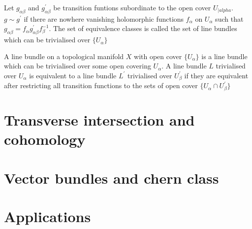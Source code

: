\documentclass{article}
\begin{document}
\begin{df}
    Let $g_{\alpha \beta }$ and $g_{\alpha \beta}^{'}$ be transition funtions subordinate
    to the open cover ${U_{|alpha}}$. $g\sim g^{'} $ if there are nowhere vanishing holomorphic functions
    $f_{\alpha}$ on ${U_{\alpha}}$ such that $g_{\alpha \beta } = f_{\alpha} g_{\alpha \beta}^{'} f_{\beta}^{-1}$.
    The set of equivalence classes is called the set of line bundles which can be trivialised over $\{U_{\alpha}\}$

    
\end{df}

\begin{df}
    A line bundle on a topological manifold $X$ with open cover $\{U_{\alpha}\}$ is a line bundle which can 
    be trivialised over some open covering ${U_{\alpha}}$. A line bundle $L$ trivialised over ${U_{\alpha}}$
    is equivalent to a line bundle $L^{'}$ trivialised over ${U_{\beta}^{'}}$ if they are equivalent
    after restricting all transition functions to the sets of open cover $\{U_{\alpha}\cap U_{\beta}^{'}\}$  
    
\end{df}

\newpage
\section{Transverse intersection and cohomology}

\newpage
\section{Vector bundles and chern class}

\newpage
\section{Applications}
\end{document}
